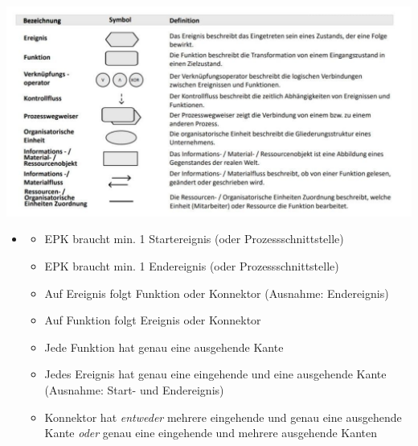 \documentclass[12pt,a4paper]{article}
\begin{document}
\vspace{-0.8cm}
\begin{center}
    \includegraphics[width=1.05\textwidth]{digi2.jpg}
\end{center}

\begin{itemize}
\item []
   \begin{itemize}
      \item EPK braucht min. 1 Startereignis (oder Prozessschnittstelle)
	   \item EPK braucht min. 1 Endereignis (oder Prozessschnittstelle)
	   \item Auf Ereignis folgt Funktion oder Konnektor (Ausnahme: Endereignis)
	   \item Auf Funktion folgt Ereignis oder Konnektor
	   \item Jede Funktion hat genau eine ausgehende Kante
	   \item Jedes Ereignis hat genau eine eingehende und eine ausgehende Kante (Ausnahme: Start- und Endereignis)
	   \item Konnektor hat \textit{entweder} mehrere eingehende und genau eine ausgehende Kante 
	         \textit{oder} genau eine eingehende und mehrere ausgehende Kanten
   \end{itemize}
\end{itemize}
\end{document}
